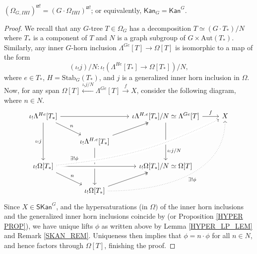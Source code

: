 \documentclass[a4paper,10pt,draft]{article}%
\begin{document}
\begin{proposition}
      \label{SRLP_IHI_PROP}
      $(\Omega_{G, IHI})^{\boxslash !} = (G \cdot \Omega_{IHI})^{\boxslash !}$;
      or equivalently, $\mathsf{Kan}_G = \mathsf{Kan}^G$.
\end{proposition}
\begin{proof}
      We recall that any $G$-tree $T \in \Omega_G$ has a decomposition
      $T \simeq (G \cdot T_*)/N$ where $T_*$ is a component of $T$ and
      $N$ is a graph subgroup of $G \times \mathrm{Aut}(T_*)$.
      Similarly, any inner $G$-horn inclusion $\Lambda^{G e}[T] \to \Omega[T]$ is isomorphic to a map of the form
      \begin{equation}
            (\iota_!j)/N: \iota_! \left(
                  \Lambda^{H e}[T_*] \to \Omega[T_*]
            \right)/N,
      \end{equation}
      where $e \in T_*$, $H = \mathrm{Stab}_G(T_*)$, and
      $j$ is a generalized inner horn inclusion in $\Omega$. 
      Now, for any span
      $\Omega[T] \xleftarrow{\iota_! j/N} \Lambda^{G e}[T] \xrightarrow{f} X$,
      consider the following diagram, where $n \in N$.
      \begin{equation}
            \begin{tikzcd}
                  \iota_!\Lambda^{H e}[T_*] \arrow[dd, "\iota_! j"'] \arrow[rr] \arrow[dr, "n"]
                  &&
                  \iota\Lambda^{H.e}[T_*]/N \simeq \Lambda^{G e}[T] \arrow[dd, near end, "\iota_!j/N"] \arrow[r, "f"]
                  &
                  X
                  \\
                  &
                  \iota_!\Lambda^{H.e}[T_*] \arrow[dd] \arrow[ur, twoheadrightarrow]
                  \\
                  \iota_!\Omega[T_*] \arrow[rr, crossing over]
                  \arrow[uurrr, crossing over, bend right=10, very near start, dotted, "\exists! \phi"] \arrow[dr, "n"]
                  &&
                  \iota_!\Omega[T_*]/N \simeq \Omega[T]
                  \\
                  &
                  \iota_!\Omega[T_*] \arrow[ur, twoheadrightarrow] \arrow[uuurr, dotted, out=0, in=-90, "\exists! \phi"']
            \end{tikzcd}
      \end{equation}
      Since $X \in \mathsf{SKan}^G$, and the hypersaturations (in $\Omega)$ of
      the inner horn inclusions and the generalized inner horn inclusions coincide
      by \cite[Lemma 5.1]{MW09} (or Proposition \ref{HYPER PROP}),
      we have unique lifts $\phi$ as written above by Lemma \ref{HYPER_LP_LEM} and Remark \ref{SKAN_REM}.
      Uniqueness then implies that $\phi = n \cdot \phi$ for all $n \in N$, and hence factors through $\Omega[T]$,
      finishing the proof.
\end{proof}
\end{document}
